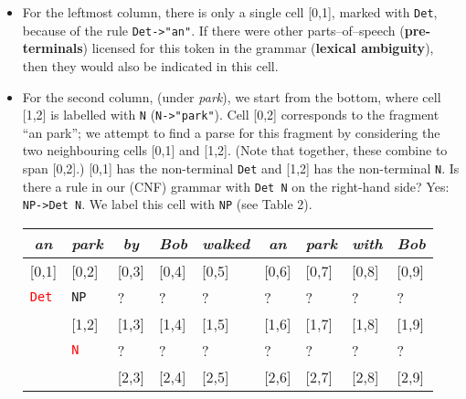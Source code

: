 \documentclass[a4paper]{article}
\begin{document}
\begin{enumerate}
\begin{enumerate}
\begin{enumerate}
\begin{itemize}
\item For the leftmost column, there is only a single cell [0,1], marked with \texttt{Det}, because of the rule \texttt{Det->"an"}. If there were other parts--of--speech (\textbf{pre-terminals}) licensed for this token in the grammar (\textbf{lexical ambiguity}), then they would also be indicated in this cell.
\item For the second column, (under \textit{park}), we start from the bottom, where cell [1,2] is labelled with \texttt{N} (\texttt{N->"park"}). Cell [0,2] corresponds to the fragment ``an park''; we attempt to find a parse for this fragment by considering the two neighbouring cells [0,1] and [1,2]. (Note that together, these combine to span [0,2].) [0,1] has the non-terminal \texttt{Det} and [1,2] has the non-terminal \texttt{N}. Is there a rule in our (CNF) grammar with \texttt{Det N} on the right-hand side? Yes: \texttt{NP->Det N}. We label this cell with \texttt{NP} (see Table 2).
\begin{table}[hp]
\centering
\begin{tabular}{ccccccccc}
\textit{an} & \textit{park} & \textit{by} & \textit{Bob} & \textit{walked} & \textit{an} & \textit{park} & \textit{with} & \textit{Bob}\\
\hline
\multicolumn{1}{|l|}{[0,1]} & \multicolumn{1}{l|}{[0,2]} & \multicolumn{1}{l|}{[0,3]} & \multicolumn{1}{l|}{[0,4]} & \multicolumn{1}{l|}{[0,5]} & \multicolumn{1}{l|}{[0,6]} & \multicolumn{1}{l|}{[0,7]} & \multicolumn{1}{l|}{[0,8]} & \multicolumn{1}{l|}{[0,9]} \\
\multicolumn{1}{|l|}{\textcolor{red}{\texttt{Det}}} & \multicolumn{1}{l|}{\texttt{NP}} & \multicolumn{1}{l|}{?} & \multicolumn{1}{l|}{?} & \multicolumn{1}{l|}{?} & \multicolumn{1}{l|}{?} & \multicolumn{1}{l|}{?} & \multicolumn{1}{l|}{?} & \multicolumn{1}{l|}{?} \\
\hline
 & \multicolumn{1}{|l|}{[1,2]} & \multicolumn{1}{l|}{[1,3]} & \multicolumn{1}{l|}{[1,4]} & \multicolumn{1}{l|}{[1,5]} & \multicolumn{1}{l|}{[1,6]} & \multicolumn{1}{l|}{[1,7]} & \multicolumn{1}{l|}{[1,8]} & \multicolumn{1}{l|}{[1,9]} \\
 & \multicolumn{1}{|l|}{\textcolor{red}{\texttt{N}}} & \multicolumn{1}{l|}{?} & \multicolumn{1}{l|}{?} & \multicolumn{1}{l|}{?} & \multicolumn{1}{l|}{?} & \multicolumn{1}{l|}{?} & \multicolumn{1}{l|}{?} & \multicolumn{1}{l|}{?} \\
\cline{2-9}
 & & \multicolumn{1}{|l|}{[2,3]} & \multicolumn{1}{l|}{[2,4]} & \multicolumn{1}{l|}{[2,5]} & \multicolumn{1}{l|}{[2,6]} & \multicolumn{1}{l|}{[2,7]} & \multicolumn{1}{l|}{[2,8]} & \multicolumn{1}{l|}{[2,9]} \\

\end{tabular}
\end{table}
\end{itemize}
\end{enumerate}
\end{enumerate}
\end{enumerate}
\end{document}
